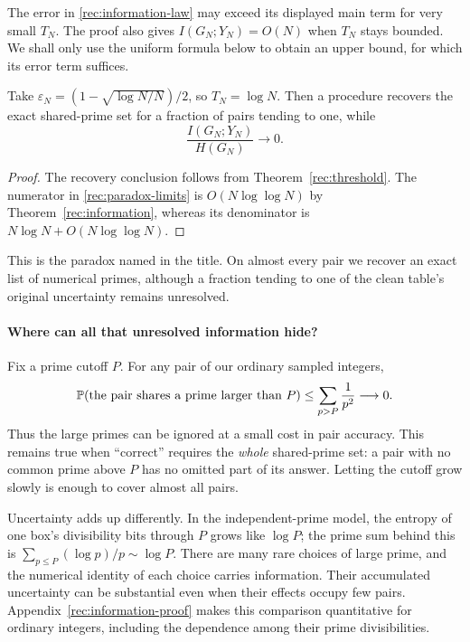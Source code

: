 The error in \eqref{rec:information-law} may exceed its displayed main
term for very small $T_N$. The proof also gives $I(G_N;Y_N)=O(N)$ when
$T_N$ stays bounded. We shall only use the uniform formula below to
obtain an upper bound, for which its error term suffices.

\begin{corollary}
\label{rec:paradox}
Take $\varepsilon_N=(1-\sqrt{\log N/N})/2$, so $T_N=\log N$.
Then a procedure recovers the exact shared-prime set for a fraction
of pairs tending to one, while
\begin{equation}\label{rec:paradox-limits}
 \frac{I(G_N;Y_N)}{H(G_N)}\longrightarrow0.
\end{equation}
\end{corollary}
\begin{proof}
The recovery conclusion follows from Theorem~\ref{rec:threshold}.
The numerator in \eqref{rec:paradox-limits} is $O(N\log\log N)$
by Theorem~\ref{rec:information}, whereas its denominator is
$N\log N+O(N\log\log N)$.
\end{proof}

This is the paradox named in the title. On almost every pair we recover
an exact list of numerical primes, although a fraction tending to one
of the clean table's original uncertainty remains unresolved.

\paragraph{Where can all that unresolved information hide?}
Fix a prime cutoff $P$. For any pair of our ordinary sampled integers,
\[
 \mathbb P(\text{the pair shares a prime larger than }P)
 \le\sum_{p>P}\frac1{p^2}\longrightarrow0.
\]
Thus the large primes can be ignored at a small cost in pair accuracy.
This remains true when ``correct'' requires the \emph{whole} shared-prime
set: a pair with no common prime above $P$ has no omitted part of its
answer. Letting the cutoff grow slowly is enough to cover almost all
pairs.

Uncertainty adds up differently. In the independent-prime model, the
entropy of one box's divisibility bits through $P$ grows like $\log P$;
the prime sum behind this is
$\sum_{p\le P}(\log p)/p\sim\log P$. There are many rare choices of
large prime, and the numerical identity of each choice carries
information. Their accumulated uncertainty can be substantial even
when their effects occupy few pairs. Appendix~\ref{rec:information-proof}
makes this comparison quantitative for ordinary integers, including
the dependence among their prime divisibilities.

